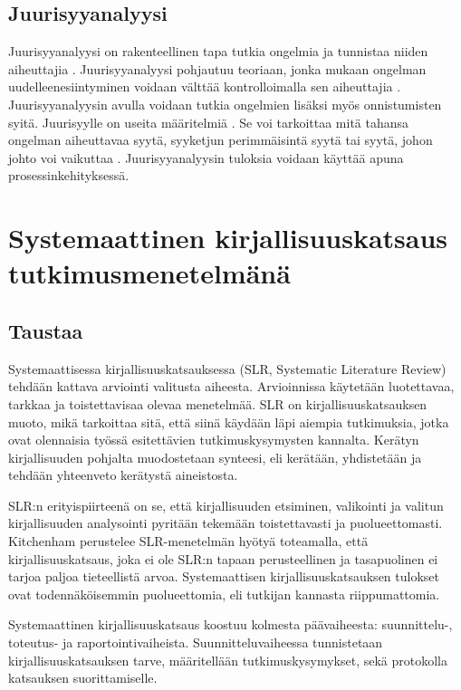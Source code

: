 \subsection{Juurisyyanalyysi}
Juurisyyanalyysi on rakenteellinen tapa tutkia ongelmia ja tunnistaa niiden aiheuttajia \citep{Lehtinen2011}. Juurisyyanalyysi pohjautuu teoriaan, jonka mukaan ongelman uudelleenesiintyminen voidaan välttää kontrolloimalla sen aiheuttajia \citep{Lehtinen2011}. Juurisyyanalyysin avulla voidaan tutkia ongelmien lisäksi myös onnistumisten syitä. \citep{Bjornson2009} Juurisyylle on useita määritelmiä \citep{Lehtinen2011}. Se voi tarkoittaa mitä tahansa ongelman aiheuttavaa syytä, syyketjun perimmäisintä syytä tai syytä, johon johto voi vaikuttaa \citep{Lehtinen2011}. Juurisyyanalyysin tuloksia voidaan käyttää apuna prosessinkehityksessä. \citep{Lehtinen2011}

\section{Systemaattinen kirjallisuuskatsaus tutkimusmenetelmänä}

\subsection{Taustaa}
Systemaattisessa kirjallisuuskatsauksessa (SLR, Systematic Literature Review) tehdään kattava arviointi valitusta aiheesta. Arvioinnissa käytetään luotettavaa, tarkkaa ja toistettavisaa olevaa menetelmää. SLR on kirjallisuuskatsauksen muoto, mikä tarkoittaa sitä, että siinä käydään läpi aiempia tutkimuksia, jotka ovat olennaisia työssä esitettävien tutkimuskysymysten kannalta. Kerätyn kirjallisuuden pohjalta muodostetaan synteesi, eli kerätään, yhdistetään ja tehdään yhteenveto kerätystä aineistosta. \citep{Kitchenham2007}

SLR:n erityispiirteenä on se, että kirjallisuuden etsiminen, valikointi ja valitun kirjallisuuden analysointi pyritään tekemään toistettavasti ja puolueettomasti. Kitchenham perustelee SLR-menetelmän hyötyä toteamalla, että kirjallisuuskatsaus, joka ei ole SLR:n tapaan perusteellinen ja tasapuolinen ei tarjoa paljoa tieteellistä arvoa. Systemaattisen kirjallisuuskatsauksen tulokset ovat todennäköisemmin puolueettomia, eli tutkijan kannasta riippumattomia. \citep{Kitchenham2007}

Systemaattinen kirjallisuuskatsaus koostuu kolmesta päävaiheesta: suunnittelu-, toteutus- ja raportointivaiheista. Suunnitteluvaiheessa tunnistetaan kirjallisuuskatsauksen tarve, määritellään tutkimuskysymykset, sekä protokolla katsauksen suorittamiselle. \citep{Kitchenham2007}

